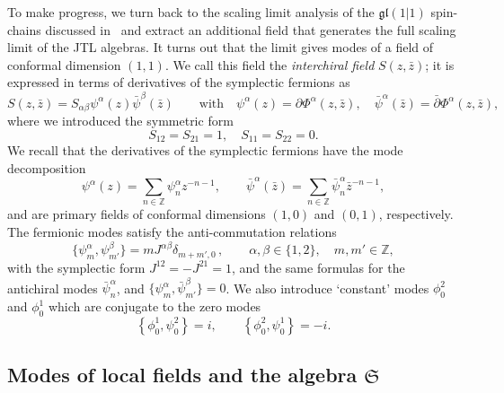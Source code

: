 \documentclass[11pt]{article}
\newcommand{\sfermp}{\psi^{2}}
\newcommand{\sfermm}{\psi^{1}}
\newcommand{\phip}{\phi^{2}}
\newcommand{\phim}{\phi^{1}}
\newcommand{\oZ}{\mathbb{Z}}
\newcommand{\interLie}{\mathfrak{S}}
\newcommand{\interch}{\interLie}
\newcommand{\gl}{\mathfrak{gl}}
\newcommand{\bz}{\bar{z}}
\newcommand{\der}{\partial}
\newcommand{\bder}{\bar{\partial}}
\newcommand{\enrg}{S}
\theoremstyle{definition}
\begin{document}
 To make progress, we turn back to the
 scaling limit analysis of the $\gl(1|1)$ spin-chains discussed
 in~\cite{GRS1} and extract an additional field that generates the
 full scaling limit of the JTL algebras.
  It turns out that the limit
gives modes of a field  of conformal dimension $(1,1)$.
We call this field
the \textit{interchiral field} $\enrg(z,\bar{z})$; it is
expressed in terms of  derivatives of the symplectic fermions as
%
\begin{equation}\label{interfielddef}
\enrg(z,\bz)=S_{\alpha\beta}\psi^{\alpha}(z)\bar{\psi}^{\beta}(\bz)\qquad \text{with}\quad
\psi^{\alpha}(z)=\der\Phi^{\alpha}(z,\bz),\quad
\bar{\psi}^{\alpha}(\bar{z})=\bder\Phi^{\alpha}(z,\bz),
\end{equation}
where we introduced the symmetric form
%
\begin{equation}
 S_{12}=S_{21}=1, \quad
S_{11}=S_{22}=0.
\end{equation}
%
We recall that the derivatives of the symplectic fermions have the mode decomposition~\cite{Kausch}
\begin{equation}
\psi^{\alpha}(z) = \sum_{n\in\oZ}\psi^{\alpha}_n z^{-n-1},\qquad \bar{\psi}^{\alpha}(\bz) = \sum_{n\in\oZ}\bar{\psi}^{\alpha}_n \bz^{-n-1},
\end{equation}
and are primary fields of conformal dimensions $(1,0)$ and $(0,1)$, respectively. The fermionic modes  satisfy
 the anti-commutation relations
%
\begin{equation}\label{sferm-rel}
\{\psi^{\alpha}_m,\psi^{\beta}_{m'}\} =
mJ^{\alpha\beta}\delta_{m+m',0}\,,\qquad \alpha,\beta\in\{1,2\},\quad m,m'\in\oZ,
\end{equation}
with the symplectic form $J^{12}=-J^{21}=1$, and the same formulas for the antichiral modes $\bar{\psi}^{\alpha}_n$, and $\{\psi^{\alpha}_m,\bar{\psi}^{\beta}_{m'}\} = 0$. We also introduce `constant' modes $\phip_0$ and $\phim_0$ which are conjugate to the zero modes
\begin{equation}\label{sferm-0-rel}
\left\{\phim_0,\sfermp_0\right\}=i,\qquad
\left\{\phip_0,\sfermm_0\right\}=-i.
\end{equation}






\subsection{Modes of local fields and the algebra $\interch$}\label{sec:interch-modes}
\end{document}
